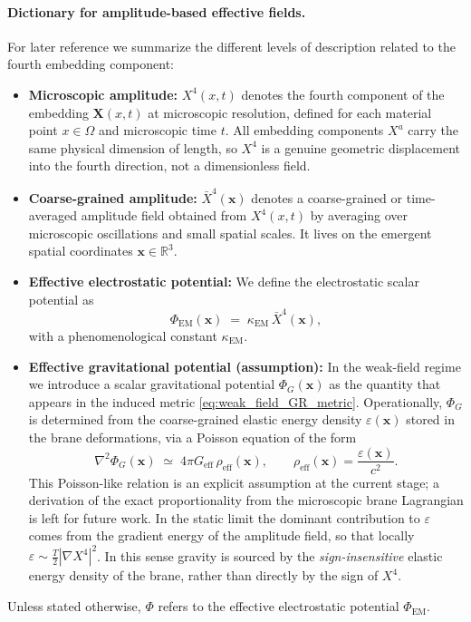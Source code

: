 \paragraph{Dictionary for amplitude-based effective fields.}
For later reference we summarize the different levels of description related to the fourth embedding component:
\begin{itemize}
  \item \textbf{Microscopic amplitude:}
    $X^4(x,t)$ denotes the fourth component of the embedding $\mathbf X(x,t)$ at microscopic resolution, defined for each material point $x \in \Omega$ and microscopic time $t$.
    All embedding components $X^a$ carry the same physical dimension of length,
    so $X^4$ is a genuine geometric displacement into the fourth direction,
    not a dimensionless field.
  \item \textbf{Coarse-grained amplitude:}
    $\bar X^4(\mathbf x)$ denotes a coarse-grained or time-averaged amplitude field obtained from $X^4(x,t)$ by averaging over microscopic oscillations and small spatial scales. It lives on the emergent spatial coordinates $\mathbf x \in \mathbb{R}^3$.
  \item \textbf{Effective electrostatic potential:}
    We define the electrostatic scalar potential as
    \[
      \Phi_{\text{EM}}(\mathbf x) \;=\; \kappa_{\text{EM}} \,\bar X^4(\mathbf x),
    \]
    with a phenomenological constant $\kappa_{\text{EM}}$.
  \item \textbf{Effective gravitational potential (assumption):}
    In the weak-field regime we introduce a scalar gravitational potential
    $\Phi_G(\mathbf x)$ as the quantity that appears in the induced metric
    \eqref{eq:weak_field_GR_metric}. Operationally, $\Phi_G$ is determined
    from the coarse-grained elastic energy density $\varepsilon(\mathbf x)$
    stored in the brane deformations, via a Poisson equation of the form
    \begin{equation}
      \nabla^2 \Phi_G(\mathbf x)
      \;\simeq\;
      4\pi G_\text{eff}\,\rho_\text{eff}(\mathbf x),
      \qquad
      \rho_\text{eff}(\mathbf x) = \frac{\varepsilon(\mathbf x)}{c^2}.
    \end{equation}
    This Poisson-like relation is an explicit assumption at the
    current stage; a derivation of the exact proportionality from
    the microscopic brane Lagrangian is left for future work.
    In the static limit the dominant contribution to $\varepsilon$ comes
    from the gradient energy of the amplitude field, so that locally
    $\varepsilon \sim \tfrac{T}{2}|\nabla X^4|^2$. In this sense gravity
    is sourced by the \emph{sign-insensitive} elastic energy density of
    the brane, rather than directly by the sign of $X^4$.
\end{itemize}
Unless stated otherwise, $\Phi$ refers to the effective electrostatic potential $\Phi_{\text{EM}}$.

